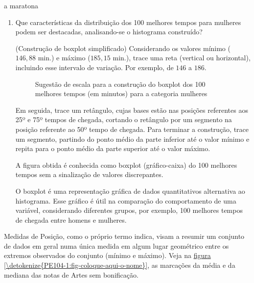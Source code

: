 \begin{task}{ a maratona}
\begin{enumerate}
\item Que características da distribuição dos 100 melhores tempos para mulheres podem ser destacadas, analisando-se o histograma construído?

(Construção de boxplot simplificado) Considerando os valores mínimo ($146{,}88$ min.) e máximo ($185{,}15$ min.), trace uma reta (vertical ou horizontal), incluindo esse intervalo de variação. Por exemplo, de $146$ a $186$.
\begin{figure}[H]
\centering


\caption{Sugestão de escala para a construção do boxplot dos 100 melhores tempos (em minutos) para a categoria mulheres}
\label{}
\end{figure}

Em seguida, trace um retângulo, cujas bases estão nas posições referentes aos 25º e 75º tempos de chegada, cortando o retângulo por um segmento na posição referente ao 50º tempo de chegada. Para terminar a construção, trace um segmento, partindo do ponto médio da parte inferior até o valor mínimo e repita para o ponto médio da parte superior até o valor máximo.

A figura obtida é conhecida como boxplot (gráfico-caixa) do 100 melhores tempos sem a sinalização de valores discrepantes.

O boxplot é uma representação gráfica de dados quantitativos alternativa ao histograma. Esse gráfico é útil na comparação do comportamento de uma variável, considerando diferentes grupos, por exemplo, 100 melhores tempos de chegada entre homens e mulheres.
\end{enumerate}
\end{task}


\label{\detokenize{PE104-1:sec-organizando1}}\label{\detokenize{PE104-1::doc}}\label{\detokenize{PE104-1:organizando-as-ideias-medidas-de-posicao}}

Medidas de Posição, como o próprio termo indica, visam a resumir um conjunto de dados em geral numa única medida em algum lugar geométrico entre os extremos observados do conjunto (mínimo e máximo). Veja na \hyperref[\detokenize{PE104-1:fig-coloque-aqui-o-nome}]{figura \ref{\detokenize{PE104-1:fig-coloque-aqui-o-nome}}}, as marcações da média e da mediana das notas de Artes sem bonificação.

